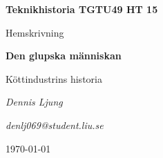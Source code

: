 \documentclass[titlepage, a4paper, 12pt]{article}
\begin{document}
\begin{titlepage}
	\centering
	\vspace*{45mm}
	 \LARGE \textbf{Teknikhistoria TGTU49 HT 15} \par
	 \vspace{5mm}
	 \Large Hemskrivning \par
	 \vspace{10mm}
	 \Huge \textbf{Den glupska människan} \par
	 \vspace{5mm}
	 \huge Köttindustrins historia \par
	 \vspace{15mm}
	 \Large \emph{Dennis Ljung} \par
	 \vspace{5mm}
	 \large \emph{denlj069@student.liu.se} \par
	 \vfill
	 {\large \today\par}	
\end{titlepage}


\tableofcontents
\thispagestyle{empty}
\newpage







{}
\end{document}

